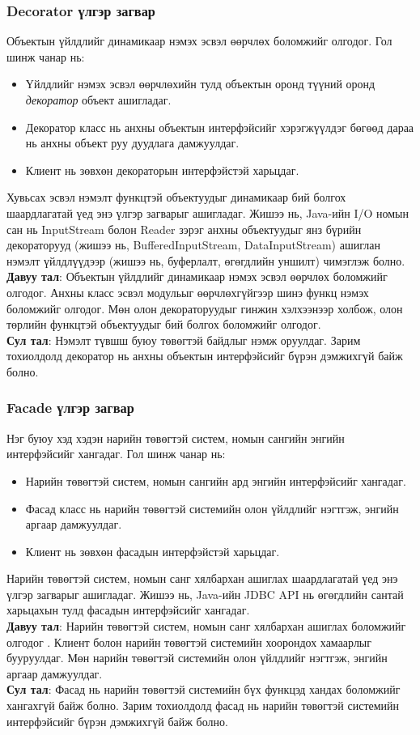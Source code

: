 \subsubsection{Decorator үлгэр загвар}
\quad \quad Объектын үйлдлийг динамикаар нэмэх эсвэл өөрчлөх боломжийг олгодог. Гол шинж чанар нь:
\begin{itemize}
	\item Үйлдлийг нэмэх эсвэл өөрчлөхийн тулд объектын оронд түүний оронд \textit{декоратор} объект ашигладаг. 
	\item Декоратор класс нь анхны объектын интерфэйсийг хэрэгжүүлдэг бөгөөд дараа нь анхны объект руу дуудлага дамжуулдаг.
	\item Клиент нь зөвхөн декораторын интерфэйстэй харьцдаг.
\end{itemize}
Хувьсах эсвэл нэмэлт функцтэй объектуудыг динамикаар бий болгох шаардлагатай үед энэ үлгэр загварыг ашигладаг. Жишээ нь, Java-ийн I/O номын сан нь InputStream болон Reader зэрэг анхны объектуудыг янз бүрийн декораторууд (жишээ нь, BufferedInputStream, DataInputStream) ашиглан нэмэлт үйлдлүүдээр (жишээ нь, буферлалт, өгөгдлийн уншилт) чимэглэж болно.\\
\textbf{Давуу тал}: Объектын үйлдлийг динамикаар нэмэх эсвэл өөрчлөх боломжийг олгодог. Анхны класс эсвэл модульыг өөрчлөхгүйгээр шинэ функц нэмэх боломжийг олгодог. Мөн олон декораторуудыг гинжин хэлхээнээр холбож, олон төрлийн функцтэй объектуудыг бий болгох боломжийг олгодог.\\
\textbf{Сул тал}: Нэмэлт түвшш буюу төвөгтэй байдлыг нэмж оруулдаг. Зарим тохиолдолд декоратор нь анхны объектын интерфэйсийг бүрэн дэмжихгүй байж болно.

\subsubsection{Facade үлгэр загвар}
\quad \quad Нэг буюу хэд хэдэн нарийн төвөгтэй систем, номын сангийн энгийн интерфэйсийг хангадаг. Гол шинж чанар нь:
\begin{itemize}
	\item Нарийн төвөгтэй систем, номын сангийн ард энгийн интерфэйсийг хангадаг.
	\item Фасад класс нь нарийн төвөгтэй системийн олон үйлдлийг нэгтгэж, энгийн аргаар дамжуулдаг.
	\item Клиент нь зөвхөн фасадын интерфэйстэй харьцдаг.
\end{itemize}
Нарийн төвөгтэй систем, номын санг хялбархан ашиглах шаардлагатай үед энэ үлгэр загварыг ашигладаг. Жишээ нь, Java-ийн JDBC API нь өгөгдлийн сантай харьцахын тулд фасадын интерфэйсийг хангадаг.\\
\textbf{Давуу тал}: Нарийн төвөгтэй систем, номын санг хялбархан ашиглах боломжийг олгодог	. Клиент болон нарийн төвөгтэй системийн хоорондох хамаарлыг бууруулдаг. Мөн нарийн төвөгтэй системийн олон үйлдлийг нэгтгэж, энгийн аргаар дамжуулдаг.\\	
\textbf{Сул тал}: Фасад нь нарийн төвөгтэй системийн бүх функцэд хандах боломжийг хангахгүй байж болно. Зарим тохиолдолд фасад нь нарийн төвөгтэй системийн интерфэйсийг бүрэн дэмжихгүй байж болно.

